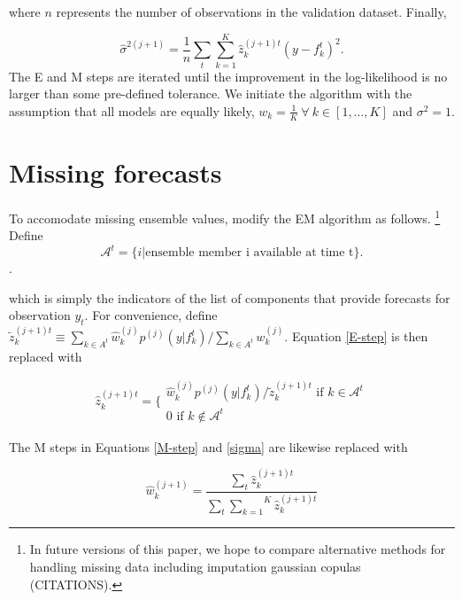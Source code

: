\documentclass[12pt,fullpage,endnotes]{article}
\begin{document}
\noindent where $n$ represents the number of observations in the
validation dataset.  Finally,

\begin{equation}
\label{sigma}
\hat{\sigma}^{2(j+1)}=\frac{1}{n}\underset{t}{\sum}\overset{K}{\underset{k=1}{\sum}}\hat{z}^{(j+1)t}_{k}(y-f_{k}^{t})^2.
\end{equation}
\noindent The E and M steps are iterated until the improvement in the
log-likelihood is no larger than some pre-defined tolerance.  We
initiate the algorithm with the assumption that all models are equally
likely, $w_k = \frac{1}{K} ~ \forall ~ k \in [1, \ldots, K]$ and
$\sigma^2=1$.


\section{Missing forecasts}
\label{missing}

To accomodate missing ensemble values, \citep{Fraley:2010} modify the EM algorithm as follows. \footnote{In future versions of this paper, we hope to compare alternative methods for handling missing data including imputation gaussian copulas (CITATIONS). }  Define $$\mathcal{A}^t = \{i|\mbox{ensemble member i available at time t}\}.$$.

\noindent which is simply the indicators of the list of components that provide forecasts for observation $y_t$.   For convenience, define $\tilde{z}_k^{(j+1)t} \equiv {{\underset{k \in A^t}{\sum}}\hat{w}^{(j)}_kp^{(j)}(y|f_{k}^{t})}/{\underset{k \in A^t}\sum w_k^{(j)}}$.  Equation \ref{E-step} is then replaced with

\begin{equation}
\hat{z}^{(j+1)t}_{k} = \Bigg\{ \begin{array}{c} {\hat{w}^{(j)}_k p^{(j)}(y|f_{k}^{t})}/{\tilde{z}_k^{(j+1)t} } \mbox{ if } k \in \mathcal{A}^t\\ 0 \mbox{ if } k \notin \mathcal{A}^t \end{array}
\end{equation}



\noindent  The M steps in Equations \ref{M-step} and \ref{sigma} are likewise replaced with

\begin{equation}
\hat{w}^{(j+1)}_k=\frac{\underset{t}{\sum}\hat{z}^{(j+1)t}_{k}}{\underset{t}{\sum}\overset{K}{\underset{k=1}{ \sum}} \hat{z}_k^{(j+1)t}}
\end{equation}
\end{document}

